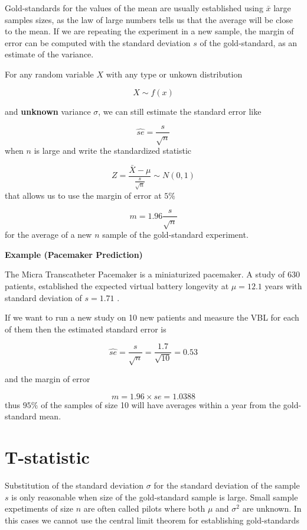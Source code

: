 \documentclass[
]{book}
\begin{document}
Gold-standards for the values of the mean are usually established using \(\bar{x}\) large samples sizes, as the law of large numbers tells us that the average will be close to the mean. If we are repeating the experiment in a new sample, the margin of error can be computed with the standard deviation \(s\) of the gold-standard, as an estimate of the variance.

For any random variable \(X\) with any type or unkown distribution

\[X \sim f(x)\]

and \textbf{unknown} variance \(\sigma\), we can still estimate the standard error like

\[\hat{se}=\frac{s}{\sqrt{n}}\] when \(n\) is large and write the standardized statistic

\[Z=\frac{\bar{X}-\mu}{\frac{s}{\sqrt{n}}}\sim N(0,1) \]
that allows us to use the margin of error at \(5\%\)

\[m= 1.96 \frac{s}{\sqrt{n}}\]
for the average of a new \(n\) sample of the gold-standard experiment.

\textbf{Example (Pacemaker Prediction)}

The Micra Transcatheter Pacemaker is a miniaturized pacemaker. A study of 630 patients, established the expected virtual battery longevity at \(\mu=12.1\) years with standard deviation of \(s=1.71\) \citep{Duray2017Micra12mo}.

If we want to run a new study on 10 new patients and measure the VBL for each of them then the estimated standard error is

\[\hat{se}=\frac{s}{\sqrt{n}}=\frac{1.7}{\sqrt{10}}= 0.53\]

and the margin of error

\[m= 1.96\times se= 1.0388\]
thus \(95\%\) of the samples of size 10 will have averages within a year from the gold-standard mean.

\hypertarget{t-statistic}{%
\section{T-statistic}\label{t-statistic}}

Substitution of the standard deviation \(\sigma\) for the standard deviation of the sample \(s\) is only reasonable when size of the gold-standard sample is large. Small sample expetiments of size \(n\) are often called pilots where both \(\mu\) and \(\sigma^2\) are unknown. In this cases we cannot use the central limit theorem for establishing gold-standards
\end{document}
